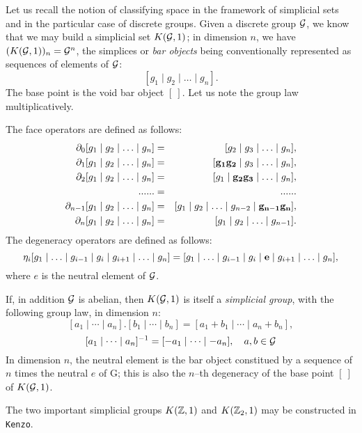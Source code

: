 Let us recall the notion of classifying space in the framework of simplicial sets and
in the particular case of discrete groups. Given a discrete group $\cal G$, we know that we may build a
simplicial set $K({\cal G}, 1)$; in dimension $n$, we have $(K({\cal G}, 1))_n = {\cal G}^n$,
the simplices or {\em bar objects} being  conventionally represented  as sequences of elements of $\cal G$:
$$ [g_1 \mid g_2 \mid \ldots \mid g_n]. $$
The base point is the void bar object $[\ ]$.
Let us note the group law multiplicatively.
\par
The face operators are defined as follows:
\begin{eqnarray*}
\partial_0 [g_1 \mid g_2 \mid \ldots \mid g_n] & = & [g_2 \mid g_3 \mid \ldots \mid g_n], \\
\partial_1 [g_1 \mid g_2 \mid \ldots \mid g_n] & = & [{\bf g_1g_2} \mid g_3 \mid \ldots \mid g_n], \\
\partial_2 [g_1 \mid g_2 \mid \ldots \mid g_n] & = & [g_1 \mid {\bf g_2g_3} \mid \ldots \mid g_n], \\
                        ......                & = &  ......  \\
\partial_{n-1} [g_1 \mid g_2 \mid \ldots \mid g_n] & = & [g_1 \mid g_2 \mid \ldots \mid g_{n-2} \mid {\bf g_{n-1}g_n}], \\
\partial_n [g_1 \mid g_2 \mid \ldots \mid g_n] & = & [g_1 \mid g_2 \mid \ldots \mid g_{n-1}].
\end{eqnarray*}
The degeneracy operators are defined as follows:
$$ \eta_i [g_1 \mid \ldots \mid g_{i-1} \mid g_i \mid g_{i+1} \mid \ldots \mid g_n] =
          [g_1 \mid \ldots \mid g_{i-1}  \mid g_i \mid {\bf e} \mid g_{i+1} \mid \ldots \mid g_n],$$
where $e$ is the neutral element of $\cal G$.
\par
If, in addition $\cal G$ is abelian, then  $K({\cal G}, 1)$ is itself a {\em simplicial group}, with the
following group law, in dimension $n$:
$$[a_1  \mid \cdots \mid a_n] . [b_1 \mid \cdots \mid b_n] = [a_1+b_1 \mid \cdots \mid a_n+b_n], $$
$$[a_1  \mid \cdots \mid a_n]^{-1}= [-a_1  \mid \cdots \mid -a_n],\quad a,b \in {\cal G}$$
In dimension $n$, the neutral element is the bar object constitued by a sequence of $n$ times the neutral $e$ of {\cal G};
this is also the $n$--th degeneracy of the base point $[\ ]$ of $K({\cal G}, 1)$.
\par
The two important simplicial groups $K({\mathbb{Z}}, 1)$ and $K({\mathbb{Z}}_2, 1)$ may be cons\-truc\-ted in {\tt Kenzo}.
\vskip 0.30cm
